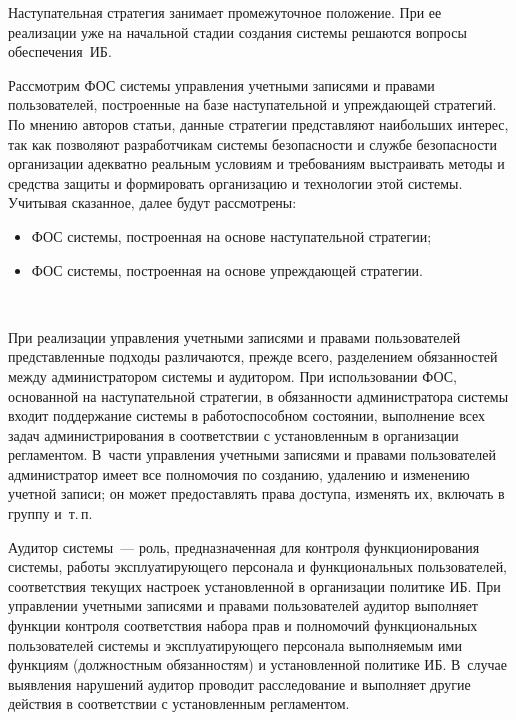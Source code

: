 \begin{multicols}{2}
       Наступательная стратегия занимает промежуточное положение. При ее 
реализации уже на начальной стадии создания сис\-те\-мы решаются вопросы 
обеспечения~ИБ. 
       
       Рассмотрим ФОС сис\-те\-мы 
       управ\-ле\-ния учетными записями и правами пользователей, построенные на базе 
наступательной и упреждающей стратегий. По мнению авторов статьи, данные\linebreak
 страте\-гии 
представляют наибольших интерес, так как позволяют разработчикам сис\-те\-мы 
безопас\-ности и службе безопас\-ности организации адекватно реальным условиям и 
требованиям выстраивать методы и средства защиты и формировать организацию и 
технологии этой сис\-те\-мы. Учитывая сказанное, далее будут рассмотрены:
       \begin{itemize}
\item ФОС сис\-те\-мы, построенная на основе 
наступательной стратегии;
\item ФОС сис\-те\-мы, построенная на основе упреж\-да\-ющей стратегии.
\end{itemize}

\begin{figure*}[b] %
\vspace*{9pt}
 \begin{center}
 \mbox{%
 \epsfxsize=159.191mm
 }
 \end{center}
 \vspace*{-9pt}
\end{figure*}

       При реализации управления учетными записями и правами пользователей 
представленные подходы различаются, прежде всего, разделением обязанностей между 
администратором сис\-те\-мы и аудито\-ром. При использовании 
ФОС, основанной на наступательной стратегии, в обязанности 
администратора сис\-те\-мы входит поддержание сис\-те\-мы в работоспособном со\-сто\-я\-нии, 
выполнение всех задач администрирования в соответствии с уста\-нов\-лен\-ным в 
организации регламентом. В~час\-ти управ\-ле\-ния учетными записями и правами 
пользователей администратор имеет все полномочия по созданию, удалению и изменению 
учетной записи; он может предостав\-лять права доступа, изменять их, включать в группу 
и~т.\,п.
       
       Аудитор системы~--- роль, предназначенная для контроля функционирования 
сис\-те\-мы, работы эксплуатирующего персонала и функциональных пользователей, 
соответствия текущих настроек уста\-нов\-лен\-ной в организации политике ИБ. При 
управлении учетными записями и правами пользователей аудитор выполняет функции 
контроля соответствия набора прав и полномочий функциональных пользователей 
сис\-те\-мы и эксплуатирующего персонала выполняемым ими функциям (должностным 
обязанностям) и уста\-нов\-лен\-ной политике ИБ. В~случае выявления нарушений аудитор 
проводит расследование и выполняет другие действия в соответствии с уста\-нов\-лен\-ным 
регламентом.
       

\end{multicols}

